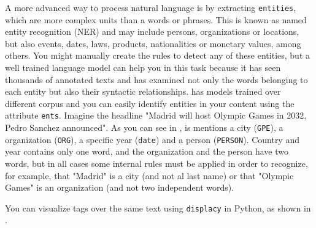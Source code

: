 A more advanced way to process natural language is by extracting \texttt{entities}, which are more complex units than a words or phrases. This is known as named entity recognition (NER) and may include persons, organizations or locations, but also events, dates, laws, products, nationalities or monetary values, among others. You might manually create the rules to detect any of these entities, but a well trained language model can help you in this task because it has seen thousands of annotated texts and has examined not only the words belonging to each entity but also their syntactic relationships.  has models trained over different corpus and you can easily identify entities in your content using the attribute \verb|ents|. Imagine the headline "Madrid will host Olympic Games in 2032, Pedro Sanchez announced". As you can see in , is mentions a city (\texttt{GPE}), a organization (\texttt{ORG}), a specific year (\texttt{date}) and a person  (\texttt{PERSON}).  Country and year contains only one word, and the organization and the person have two words, but in all cases some internal rules must be applied in order to recognize, for example, that "Madrid" is a city (and not al last name) or that "Olympic Games" is an organization (and not two independent words).


You can visualize tags over the same text using \texttt{displacy}  in Python, as shown in .


